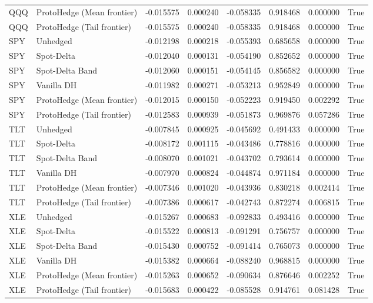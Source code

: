 \begin{tabular}{llrrrrrr}
QQQ & ProtoHedge (Mean frontier) & -0.015575 & 0.000240 & -0.058335 & 0.918468 & 0.000000 & True \\
QQQ & ProtoHedge (Tail frontier) & -0.015575 & 0.000240 & -0.058335 & 0.918468 & 0.000000 & True \\
SPY & Unhedged & -0.012198 & 0.000218 & -0.055393 & 0.685658 & 0.000000 & True \\
SPY & Spot-Delta & -0.012040 & 0.000131 & -0.054190 & 0.852652 & 0.000000 & True \\
SPY & Spot-Delta Band & -0.012060 & 0.000151 & -0.054145 & 0.856582 & 0.000000 & True \\
SPY & Vanilla DH & -0.011982 & 0.000271 & -0.053213 & 0.952849 & 0.000000 & True \\
SPY & ProtoHedge (Mean frontier) & -0.012015 & 0.000150 & -0.052223 & 0.919450 & 0.002292 & True \\
SPY & ProtoHedge (Tail frontier) & -0.012583 & 0.000939 & -0.051873 & 0.969876 & 0.057286 & True \\
TLT & Unhedged & -0.007845 & 0.000925 & -0.045692 & 0.491433 & 0.000000 & True \\
TLT & Spot-Delta & -0.008172 & 0.001115 & -0.043486 & 0.778816 & 0.000000 & True \\
TLT & Spot-Delta Band & -0.008070 & 0.001021 & -0.043702 & 0.793614 & 0.000000 & True \\
TLT & Vanilla DH & -0.007970 & 0.000824 & -0.044874 & 0.971184 & 0.000000 & True \\
TLT & ProtoHedge (Mean frontier) & -0.007346 & 0.001020 & -0.043936 & 0.830218 & 0.002414 & True \\
TLT & ProtoHedge (Tail frontier) & -0.007386 & 0.000617 & -0.042743 & 0.872274 & 0.006815 & True \\
XLE & Unhedged & -0.015267 & 0.000683 & -0.092833 & 0.493416 & 0.000000 & True \\
XLE & Spot-Delta & -0.015522 & 0.000813 & -0.091291 & 0.756757 & 0.000000 & True \\
XLE & Spot-Delta Band & -0.015430 & 0.000752 & -0.091414 & 0.765073 & 0.000000 & True \\
XLE & Vanilla DH & -0.015382 & 0.000664 & -0.088240 & 0.968815 & 0.000000 & True \\
XLE & ProtoHedge (Mean frontier) & -0.015263 & 0.000652 & -0.090634 & 0.876646 & 0.002252 & True \\
XLE & ProtoHedge (Tail frontier) & -0.015683 & 0.000422 & -0.085528 & 0.914761 & 0.081428 & True \\

\end{tabular}
